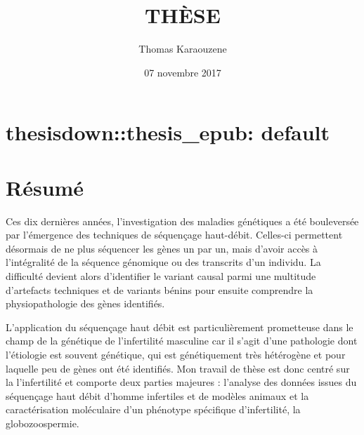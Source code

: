 \documentclass[12pt,twoside]{ugathesis}
\title{THÈSE}
\author{Thomas Karaouzene}
\date{07 novembre 2017}
\begin{document}
  \maketitle

\frontmatter %
\pagestyle{empty} %



  \hypersetup{linkcolor=black}
  \setcounter{tocdepth}{3}
  \tableofcontents

  \listoftables

  \listoffigures



\mainmatter %
\pagestyle{fancyplain} %

\chapter{thesisdown::thesis\_epub:
default}\label{thesisdownthesis_epub-default}

\chapter*{Résumé}\label{resume}

\newpage

Ces dix dernières années, l'investigation des maladies génétiques a été
bouleversée par l'émergence des techniques de séquençage haut-débit.
Celles-ci permettent désormais de ne plus séquencer les gènes un par un,
mais d'avoir accès à l'intégralité de la séquence génomique ou des
transcrits d'un individu. La difficulté devient alors d'identifier le
variant causal parmi une multitude d'artefacts techniques et de variants
bénins pour ensuite comprendre la physiopathologie des gènes identifiés.

L'application du séquençage haut débit est particulièrement prometteuse
dans le champ de la génétique de l'infertilité masculine car il s'agit
d'une pathologie dont l'étiologie est souvent génétique, qui est
génétiquement très hétérogène et pour laquelle peu de gènes ont été
identifiés. Mon travail de thèse est donc centré sur la l'infertilité et
comporte deux parties majeures : l'analyse des données issues du
séquençage haut débit d'homme infertiles et de modèles animaux et la
caractérisation moléculaire d'un phénotype spécifique d'infertilité, la
globozoospermie.
\end{document}
